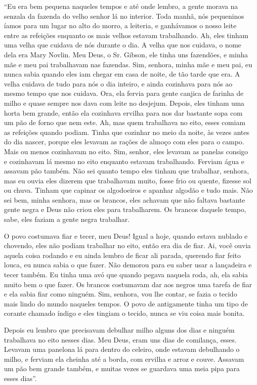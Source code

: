 ``Eu era bem pequena naqueles tempos e até onde lembro, a gente morava
na senzala da fazenda do velho senhor lá no interior. Toda manhã, nós
pequeninos íamos para um lugar no alto do morro, a leiteria, e
ganhávamos o nosso leite entre as refeições enquanto os mais velhos
estavam trabalhando. Ah, eles tinham uma velha que cuidava de nós
durante o dia. A velha que nos cuidava, o nome dela era Mary Novlin. Meu
Deus, o Sr. Gibson, ele tinha uns fazendões, e minha mãe e meu pai
trabalhavam nas fazendas. Sim, senhora, minha mãe e meu pai, eu nunca
sabia quando eles iam chegar em casa de noite, de tão tarde que era. A
velha cuidava de tudo para nós o dia inteiro, e ainda cozinhava para nós
ao mesmo tempo que nos cuidava. Ora, ela fervia para gente canjica de
farinha de milho e quase sempre nos dava com leite no desjejum. Depois,
eles tinham uma horta bem grande, então ela cozinhava ervilha para nos
dar bastante sopa com um pão de forno que nem este. Ah, mas quem
trabalhava no eito, esses comiam as refeições quando podiam. Tinha que
cozinhar no meio da noite, às vezes antes do dia nascer, porque eles
levavam as rações de almoço com eles para o campo. Mais ou menos
cozinhavam no eito. Sim, senhor, eles levavam as panelas consigo e
cozinhavam lá mesmo no eito enquanto estavam trabalhando. Ferviam água e
assavam pão também. Não sei quanto tempo eles tinham que trabalhar,
senhora, mas eu ouvia eles dizerem que trabalhavam muito, fosse frio ou
quente, fizesse sol ou chuva. Tinham que capinar os algodoeiros e
apanhar algodão e tudo mais. Não sei bem, minha senhora, mas os brancos,
eles achavam que não faltava bastante gente negra e Deus não criou eles
para trabalharem. Os brancos daquele tempo, sabe, eles faziam a gente
negra trabalhar.

O povo costumava fiar e tecer, meu Deus! Igual a hoje, quando estava
nublado e chovendo, eles não podiam trabalhar no eito, então era dia de
fiar. Ai, você ouvia aquela coisa rodando e eu ainda lembro de ficar ali
parada, querendo fiar feito louca, eu nunca sabia o que fazer. Não
demorou para eu saber usar a lançadeira e tecer também. Eu tinha uma avó
que quando pegava naquela roda, ah, ela sabia muito bem o que fazer. Os
brancos costumavam dar aos negros uma tarefa de fiar e ela sabia fiar
como ninguém. Sim, senhora, vou lhe contar, se fazia o tecido mais lindo
do mundo naqueles tempos. O povo de antigamente tinha um tipo de corante
chamado índigo e eles tingiam o tecido, nunca se viu coisa mais bonita.

Depois eu lembro que precisavam debulhar milho alguns dos dias e ninguém
trabalhava no eito nesses dias. Meu Deus, eram uns dias de comilança,
esses. Levavam uma panelona lá para dentro do celeiro, onde estavam
debulhando o milho, e ferviam ela cheinha até a borda, com ervilha e
arroz e couve. Assavam um pão bem grande também, e muitas vezes se
guardava uma meia pipa para esses dias''.

